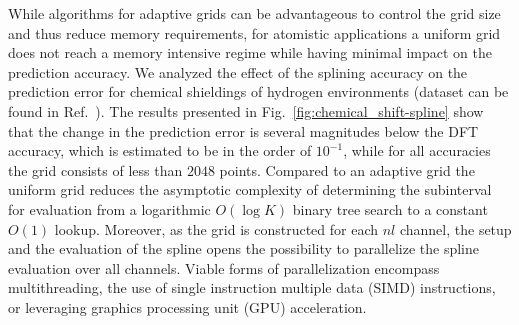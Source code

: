 While algorithms for adaptive grids can be advantageous to control the grid size and thus reduce memory requirements, for atomistic applications a uniform grid does not reach a memory intensive regime while having minimal impact on the prediction accuracy.
We analyzed the effect of the splining accuracy on the prediction error for chemical shieldings of hydrogen environments (dataset can be found in Ref.~\cite{paruzzo2018chemical}).
The results presented in Fig.~\ref{fig:chemical_shift-spline} show that the change in the prediction error is several magnitudes below the DFT accuracy, which is estimated to be in the order of $10^{-1}$, while for all accuracies the grid consists of less than $2048$ points.
Compared to an adaptive grid the uniform grid reduces the asymptotic complexity of determining the subinterval for evaluation from a logarithmic $O(\log K)$ binary tree search to a constant $O(1)$ lookup.
Moreover, as the grid is constructed for each $nl$ channel, the setup and the evaluation of the spline opens the possibility to parallelize the spline evaluation over all channels.
Viable forms of parallelization encompass multithreading, the use of single instruction multiple data (SIMD) instructions, or leveraging graphics processing unit (GPU) acceleration.

